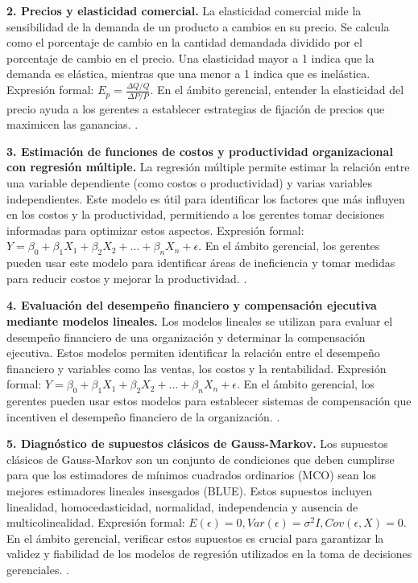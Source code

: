 {\textbf{2. Precios y elasticidad comercial.} La elasticidad comercial mide la sensibilidad de la demanda de un producto a cambios en su precio. Se calcula como el porcentaje de cambio en la cantidad demandada dividido por el porcentaje de cambio en el precio. Una elasticidad mayor a 1 indica que la demanda es elástica, mientras que una menor a 1 indica que es inelástica. Expresión formal: $E_p = \frac{\Delta Q/Q}{\Delta P/P}$. En el ámbito gerencial, entender la elasticidad del precio ayuda a los gerentes a establecer estrategias de fijación de precios que maximicen las ganancias. \citep{anderson2012,lind2012,wackerly2010}.

\textbf{3. Estimación de funciones de costos y productividad organizacional con regresión múltiple.} La regresión múltiple permite estimar la relación entre una variable dependiente (como costos o productividad) y varias variables independientes. Este modelo es útil para identificar los factores que más influyen en los costos y la productividad, permitiendo a los gerentes tomar decisiones informadas para optimizar estos aspectos. Expresión formal: $Y = \beta_0 + \beta_1X_1 + \beta_2X_2 +... + \beta_nX_n + \epsilon$. En el ámbito gerencial, los gerentes pueden usar este modelo para identificar áreas de ineficiencia y tomar medidas para reducir costos y mejorar la productividad. \citep{anderson2012,lind2012,wackerly2010}.

\textbf{4. Evaluación del desempeño financiero y compensación ejecutiva mediante modelos lineales.} Los modelos lineales se utilizan para evaluar el desempeño financiero de una organización y determinar la compensación ejecutiva. Estos modelos permiten identificar la relación entre el desempeño financiero y variables como las ventas, los costos y la rentabilidad. Expresión formal: $Y = \beta_0 + \beta_1X_1 + \beta_2X_2 +... + \beta_nX_n + \epsilon$. En el ámbito gerencial, los gerentes pueden usar estos modelos para establecer sistemas de compensación que incentiven el desempeño financiero de la organización. \citep{anderson2012,lind2012,wackerly2010}.

\textbf{5. Diagnóstico de supuestos clásicos de Gauss-Markov.} Los supuestos clásicos de Gauss-Markov son un conjunto de condiciones que deben cumplirse para que los estimadores de mínimos cuadrados ordinarios (MCO) sean los mejores estimadores lineales insesgados (BLUE). Estos supuestos incluyen linealidad, homocedasticidad, normalidad, independencia y ausencia de multicolinealidad. Expresión formal: $E(\epsilon) = 0, Var(\epsilon) = \sigma^2I, Cov(\epsilon, X) = 0$. En el ámbito gerencial, verificar estos supuestos es crucial para garantizar la validez y fiabilidad de los modelos de regresión utilizados en la toma de decisiones gerenciales. \citep{anderson2012,lind2012,wackerly2010}.

}
